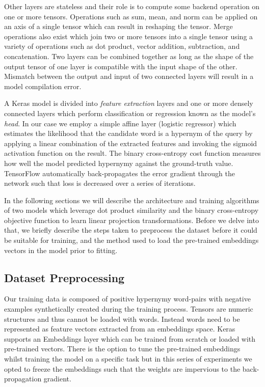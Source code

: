 Other layers are stateless and their role is to compute some backend operation on one or more tensors.  Operations such as sum, mean, and norm can be applied on an axis of a single tensor which can result in reshaping the tensor.  Merge operations also exist which join two or more tensors into a single tensor using a variety of operations such as dot product, vector addition, subtraction, and concatenation.  Two layers can be combined together as long as the shape of the output tensor of one layer is compatible with the input shape of the other.  Mismatch between the output and input of two connected layers will result in a model compilation error.

A Keras model is divided into \textit{feature extraction} layers and one or more densely connected layers which perform classification or regression known as the model's \textit{head}.  In our case we employ a simple affine layer (logistic regressor) which estimates the likelihood that the candidate word is a hypernym of the query by applying a linear combination of the extracted features and invoking the sigmoid activation function on the result.  The binary cross-entropy cost function measures how well the model predicted hypernymy against the ground-truth value.  TensorFlow automatically back-propagates the error gradient through the network such that loss is decreased over a series of iterations.

In the following sections we will describe the architecture and training algorithms of two models which leverage dot product similarity and the binary cross-entropy objective function to learn linear projection transformations.  Before we delve into that, we briefly describe the steps taken to preprocess the dataset before it could be suitable for training, and the method used to load the pre-trained embeddings vectors in the model prior to fitting.

\subsection{Dataset Preprocessing} \label{dataset_preproc}
Our training data is composed of positive hypernymy word-pairs with negative examples synthetically created during the training process.  Tensors are numeric structures and thus cannot be loaded with words.  Instead words need to be represented as feature vectors extracted from an embeddings space.  Keras supports an Embeddings layer which can be trained from scratch or loaded with pre-trained vectors. There is the option to tune the pre-trained embeddings whilst training the model on a specific task but in this series of experiments we opted to freeze the embeddings such that the weights are impervious to the back-propagation gradient.

